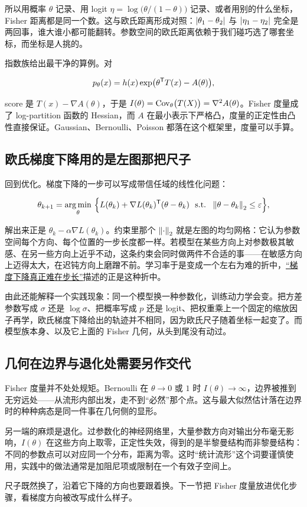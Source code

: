 所以用概率 \(\theta\) 记录、用 logit \(\eta=\log\bigl(\theta/(1-\theta)\bigr)\) 记录、或者用别的什么坐标，Fisher 距离都是同一个数。这与欧氏距离形成对照：\(\left|\theta_1-\theta_2\right|\) 与 \(\left|\eta_1-\eta_2\right|\) 完全是两回事，谁大谁小都可能翻转。参数空间的欧氏距离依赖于我们碰巧选了哪套坐标，而坐标是人挑的。

指数族给出最干净的算例。对

\[
p_\theta(x)=h(x)\exp\bigl(\theta^{\mathsf{T}}T(x)-A(\theta)\bigr),
\]

score 是 \(T(x)-\nabla A(\theta)\)，于是 \(I(\theta)=\operatorname{Cov}_\theta\bigl(T(X)\bigr)=\nabla^2A(\theta)\)。Fisher 度量成了 log-partition 函数的 Hessian，而 \(A\) 在最小表示下严格凸，度量的正定性由凸性直接保证。Gaussian、Bernoulli、Poisson 都落在这个框架里，度量可以手算。

\subsection{欧氏梯度下降用的是左图那把尺子}

回到优化。梯度下降的一步可以写成带信任域的线性化问题：

\[
\theta_{k+1}=\operatorname*{arg\,min}_{\theta}\ \Bigl\{
L(\theta_k)+\nabla L(\theta_k)^{\mathsf{T}}(\theta-\theta_k)
\ \ \text{s.t.}\ \ \left\lVert\theta-\theta_k\right\rVert_2\le\varepsilon
\Bigr\},
\]

解出来正是 \(\theta_k-\alpha\nabla L(\theta_k)\)。约束里那个 \(\left\lVert\cdot\right\rVert_2\) 就是左图的均匀网格：它认为参数空间每个方向、每个位置的一步长度都一样。若模型在某些方向上对参数极其敏感、在另一些方向上近乎不动，这条约束会同时做两件不合适的事——在敏感方向上迈得太大，在迟钝方向上磨蹭不前。学习率于是变成一个左右为难的折中，\hyperref[sec:09-Convex-Optimization/06-Optimization-Algorithms/01]{``梯度下降真正难在步长''}描述的正是这种折中。

由此还能解释一个实践现象：同一个模型换一种参数化，训练动力学会变。把方差参数写成 \(\sigma\) 还是 \(\log\sigma\)、把概率写成 \(p\) 还是 logit、把权重乘上一个固定的缩放因子再学，欧氏梯度下降给出的轨迹并不相同，因为欧氏尺子随着坐标一起变了。而模型族本身、以及它上面的 Fisher 几何，从头到尾没有动过。

\subsection{几何在边界与退化处需要另作交代}

Fisher 度量并不处处规矩。Bernoulli 在 \(\theta\to0\) 或 \(1\) 时 \(I(\theta)\to\infty\)，边界被推到无穷远处——从流形内部出发，走不到``必然''那个点。这与最大似然估计落在边界时的种种病态是同一件事在几何侧的显形。

另一端的麻烦是退化。过参数化的神经网络里，大量参数方向对输出分布毫无影响，\(I(\theta)\) 在这些方向上取零，正定性失效，得到的是半黎曼结构而非黎曼结构：不同的参数点可以对应同一个分布，距离为零。这时``统计流形''这个词要谨慎使用，实践中的做法通常是加阻尼项或限制在一个有效子空间上。

尺子既然换了，沿着它下降的方向也要跟着换。下一节把 Fisher 度量放进优化步骤，看梯度方向被改写成什么样子。
